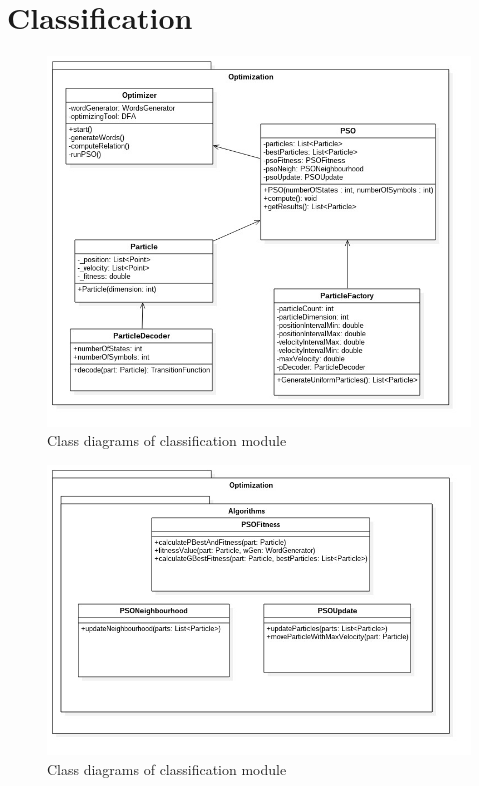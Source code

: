 \documentclass{mini}
\begin{document}

\section{Classification}

%
%
\begin{figure}[H]
    \centering
    \includegraphics[width=1.0\textwidth]{../uml/classes/optimizationMain.jpg}
    \caption{Class diagrams of classification module}
    \label{fig:classification_main_class}
\end{figure}

\begin{figure}[H]
    \centering
    \includegraphics[width=1.0\textwidth]{../uml/classes/optimizationAlg.jpg}
    \caption{Class diagrams of classification module}
    \label{fig:classification_alg_class}
\end{figure}
\end{document}
